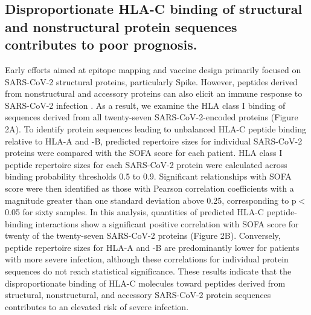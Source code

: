 \documentclass[utf8]{frontiersinFPHY_FAMS} %
\begin{document}
\subsection*{Disproportionate HLA-C binding of structural and nonstructural protein sequences contributes to poor prognosis.} Early efforts aimed at epitope mapping and vaccine design primarily focused on SARS-CoV-2 structural proteins, particularly Spike. However, peptides derived from nonstructural and accessory proteins can also elicit an immune response to SARS-CoV-2 infection \citep{32473127, 32887977}. As a result, we examine the HLA class I binding of sequences derived from all twenty-seven SARS-CoV-2-encoded proteins (Figure 2A). To identify protein sequences leading to unbalanced HLA-C peptide binding relative to HLA-A and -B, predicted repertoire sizes for individual SARS-CoV-2 proteins were compared with the SOFA score for each patient. HLA class I peptide repertoire sizes for each SARS-CoV-2 protein were calculated across binding probability thresholds 0.5 to 0.9. Significant relationships with SOFA score were then identified as those with Pearson correlation coefficients with a magnitude greater than one standard deviation above 0.25, corresponding to p$<$0.05 for sixty samples.  In this analysis, quantities of predicted HLA-C peptide-binding interactions show a significant positive correlation with SOFA score for twenty of the twenty-seven SARS-CoV-2 proteins (Figure 2B). Conversely, peptide repertoire sizes for HLA-A and -B are predominantly lower for patients with more severe infection, although these correlations for individual protein sequences do not reach statistical significance. These results indicate that the disproportionate binding of HLA-C molecules toward peptides derived from structural, nonstructural, and accessory SARS-CoV-2 protein sequences contributes to an elevated risk of severe infection.
\end{document}
